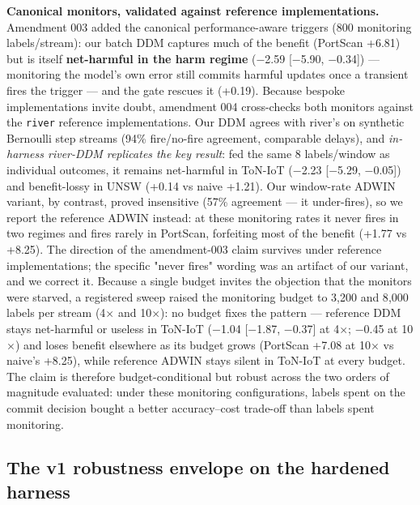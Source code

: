 \documentclass[a4paper,11pt]{article}
\makeatletter
\let\supp@subsection\subsection
\renewcommand{\subsection}{\FloatBarrier\supp@subsection}
\makeatother
\begin{document}
\textbf{Canonical monitors, validated against reference implementations.} Amendment 003 added the canonical performance-aware triggers (800 monitoring labels/stream): our batch DDM captures much of the benefit (PortScan +6.81) but is itself \textbf{net-harmful in the harm regime} ($-$2.59 [$-$5.90, $-$0.34]) --- monitoring the model's own error still commits harmful updates once a transient fires the trigger --- and the gate rescues it (+0.19). Because bespoke implementations invite doubt, amendment 004 cross-checks both monitors against the \texttt{river} reference implementations. Our DDM agrees with river's on synthetic Bernoulli step streams (94\% fire/no-fire agreement, comparable delays), and \emph{in-harness river-DDM replicates the key result}: fed the same 8 labels/window as individual outcomes, it remains net-harmful in ToN-IoT ($-$2.23 [$-$5.29, $-$0.05]) and benefit-lossy in UNSW (+0.14 vs naive +1.21). Our window-rate ADWIN variant, by contrast, proved insensitive (57\% agreement --- it under-fires), so we report the reference ADWIN instead: at these monitoring rates it never fires in two regimes and fires rarely in PortScan, forfeiting most of the benefit (+1.77 vs +8.25). The direction of the amendment-003 claim survives under reference implementations; the specific "never fires" wording was an artifact of our variant, and we correct it. Because a single budget invites the objection that the monitors were starved, a registered sweep raised the monitoring budget to 3{,}200 and 8{,}000 labels per stream (4$\times$ and 10$\times$): no budget fixes the pattern --- reference DDM stays net-harmful or useless in ToN-IoT ($-$1.04 [$-$1.87, $-$0.37] at 4$\times$; $-$0.45 at 10$\times$) and loses benefit elsewhere as its budget grows (PortScan +7.08 at 10$\times$ vs naive's +8.25), while reference ADWIN stays silent in ToN-IoT at every budget. The claim is therefore budget-conditional but robust across the two orders of magnitude evaluated: under these monitoring configurations, labels spent on the commit decision bought a better accuracy--cost trade-off than labels spent monitoring.

\subsection{The v1 robustness envelope on the hardened harness}
\end{document}

